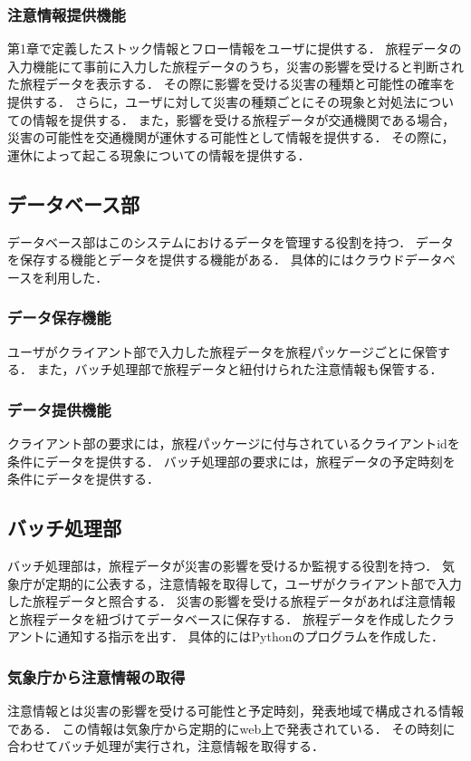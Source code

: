 \subsubsection{注意情報提供機能}
第1章で定義したストック情報とフロー情報をユーザに提供する．
旅程データの入力機能にて事前に入力した旅程データのうち，災害の影響を受けると判断された旅程データを表示する．
その際に影響を受ける災害の種類と可能性の確率を提供する．
さらに，ユーザに対して災害の種類ごとにその現象と対処法についての情報を提供する．
また，影響を受ける旅程データが交通機関である場合，災害の可能性を交通機関が運休する可能性として情報を提供する．
その際に，運休によって起こる現象についての情報を提供する．

\subsection{データベース部}
データベース部はこのシステムにおけるデータを管理する役割を持つ．
データを保存する機能とデータを提供する機能がある．
具体的にはクラウドデータベースを利用した．

\subsubsection{データ保存機能}
ユーザがクライアント部で入力した旅程データを旅程パッケージごとに保管する．
また，バッチ処理部で旅程データと紐付けられた注意情報も保管する．

\subsubsection{データ提供機能}
クライアント部の要求には，旅程パッケージに付与されているクライアントidを条件にデータを提供する．
バッチ処理部の要求には，旅程データの予定時刻を条件にデータを提供する．

\subsection{バッチ処理部}
バッチ処理部は，旅程データが災害の影響を受けるか監視する役割を持つ．
気象庁が定期的に公表する，注意情報を取得して，ユーザがクライアント部で入力した旅程データと照合する．
災害の影響を受ける旅程データがあれば注意情報と旅程データを紐づけてデータベースに保存する．
旅程データを作成したクラアントに通知する指示を出す．
具体的にはPythonのプログラムを作成した．

\subsubsection{気象庁から注意情報の取得}
注意情報とは災害の影響を受ける可能性と予定時刻，発表地域で構成される情報である．
この情報は気象庁から定期的にweb上で発表されている．
その時刻に合わせてバッチ処理が実行され，注意情報を取得する．

